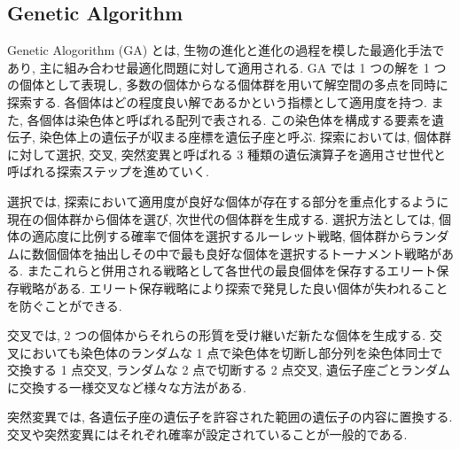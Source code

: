 \documentclass[12pt]{jarticle}
\begin{document}
\subsection{Genetic Algorithm}
Genetic Alogorithm (GA) とは, 生物の進化と進化の過程を模した最適化手法であり, 主に組み合わせ最適化問題に対して適用される. GA では 1 つの解を 1 つの個体として表現し, 多数の個体からなる個体群を用いて解空間の多点を同時に探索する. 各個体はどの程度良い解であるかという指標として適用度を持つ. また, 各個体は染色体と呼ばれる配列で表される. この染色体を構成する要素を遺伝子, 染色体上の遺伝子が収まる座標を遺伝子座と呼ぶ. 探索においては, 個体群に対して選択, 交叉, 突然変異と呼ばれる 3 種類の遺伝演算子を適用させ世代と呼ばれる探索ステップを進めていく.\par
選択では, 探索において適用度が良好な個体が存在する部分を重点化するように現在の個体群から個体を選び, 次世代の個体群を生成する. 選択方法としては, 個体の適応度に比例する確率で個体を選択するルーレット戦略, 個体群からランダムに数個個体を抽出しその中で最も良好な個体を選択するトーナメント戦略がある. またこれらと併用される戦略として各世代の最良個体を保存するエリート保存戦略がある. エリート保存戦略により探索で発見した良い個体が失われることを防ぐことができる. \par
交叉では, 2 つの個体からそれらの形質を受け継いだ新たな個体を生成する. 交叉においても染色体のランダムな 1 点で染色体を切断し部分列を染色体同士で交換する 1 点交叉, ランダムな 2 点で切断する 2 点交叉, 遺伝子座ごとランダムに交換する一様交叉など様々な方法がある. \par
突然変異では, 各遺伝子座の遺伝子を許容された範囲の遺伝子の内容に置換する.
交叉や突然変異にはそれぞれ確率が設定されていることが一般的である\cite{GA説明}. 
\end{document}
